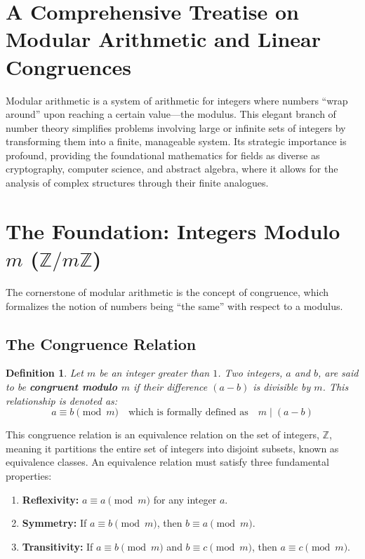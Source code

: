 \section{A Comprehensive Treatise on Modular Arithmetic and Linear Congruences}
\newtheorem{definition}{Definition}[section]
Modular arithmetic is a system of arithmetic for integers where numbers ``wrap around'' upon reaching a certain value---the modulus. This elegant branch of number theory simplifies problems involving large or infinite sets of integers by transforming them into a finite, manageable system. Its strategic importance is profound, providing the foundational mathematics for fields as diverse as cryptography, computer science, and abstract algebra, where it allows for the analysis of complex structures through their finite analogues.

\section{The Foundation: Integers Modulo $m$ ($\mathbb{Z}/m\mathbb{Z}$)}
The cornerstone of modular arithmetic is the concept of congruence, which formalizes the notion of numbers being ``the same'' with respect to a modulus.

\subsection{The Congruence Relation}
\begin{definition}
Let $m$ be an integer greater than $1$. Two integers, $a$ and $b$, are said to be \textbf{congruent modulo $m$} if their difference $(a - b)$ is divisible by $m$. This relationship is denoted as:
$$ a \equiv b \pmod{m} \quad \text{which is formally defined as} \quad m \mid (a - b) $$
\end{definition}
This congruence relation is an equivalence relation on the set of integers, $\mathbb{Z}$, meaning it partitions the entire set of integers into disjoint subsets, known as equivalence classes. An equivalence relation must satisfy three fundamental properties:
\begin{enumerate}
    \item \textbf{Reflexivity:} $a \equiv a \pmod{m}$ for any integer $a$.
    \item \textbf{Symmetry:} If $a \equiv b \pmod{m}$, then $b \equiv a \pmod{m}$.
    \item \textbf{Transitivity:} If $a \equiv b \pmod{m}$ and $b \equiv c \pmod{m}$, then $a \equiv c \pmod{m}$.
\end{enumerate}

